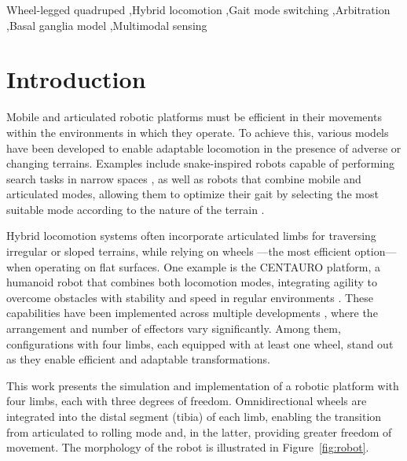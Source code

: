 \documentclass[preprint,12pt]{elsarticle}
\begin{document}
\begin{frontmatter}
\begin{keyword}

Wheel-legged quadruped \sep Hybrid locomotion \sep Gait mode switching \sep Arbitration \sep Basal ganglia model \sep Multimodal sensing

\end{keyword}

\end{frontmatter}



\section{Introduction}
Mobile and articulated robotic platforms must be efficient in their movements within the environments in which they operate. To achieve this, various models have been developed to enable adaptable locomotion in the presence of adverse or changing terrains. Examples include snake-inspired robots capable of performing search tasks in narrow spaces \citep{chen2024}, as well as robots that combine mobile and articulated modes, allowing them to optimize their gait by selecting the most suitable mode according to the nature of the terrain \citep{Ijspeert2014}. 

Hybrid locomotion systems often incorporate articulated limbs for traversing irregular or sloped terrains, while relying on wheels ---the most efficient option--- when operating on flat surfaces. One example is the CENTAURO platform, a humanoid robot that combines both locomotion modes, integrating agility to overcome obstacles with stability and speed in regular environments \citep{belli2021optimizationbasedquadrupedalhybridwheeledlegged}. These capabilities have been implemented across multiple developments \citep{bjelonic2019,schwarz2016,zhao2021design,cao2022omniwheg,KHAN2024104775,SUN201730}, where the arrangement and number of effectors vary significantly. Among them, configurations with four limbs, each equipped with at least one wheel, stand out as they enable efficient and adaptable transformations. 

This work presents the simulation and implementation of a robotic platform with four limbs, each with three degrees of freedom. Omnidirectional wheels are integrated into the distal segment (tibia) of each limb, enabling the transition from articulated to rolling mode and, in the latter, providing greater freedom of movement. The morphology of the robot is illustrated in Figure~\ref{fig:robot}. 
\end{document}
